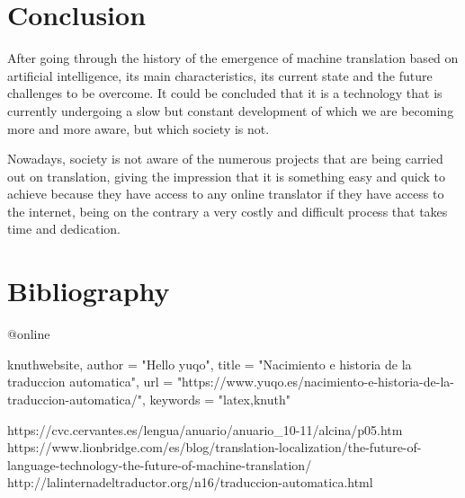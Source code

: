\documentclass[a4paper]{article}
\theoremstyle{plain}
\theoremstyle{definition}
\begin{document}
	
	\section{Conclusion}
	\label{sec:examples}	

	After going through the history of the emergence of machine translation based on artificial intelligence, its main characteristics, its current state and the future challenges to be overcome. It could be concluded that it is a technology that is currently undergoing a slow but constant development of which we are becoming more and more aware, but which society is not.\par 
    Nowadays, society is not aware of the numerous projects that are being carried out on translation, giving the impression that it is something easy and quick to achieve because they have access to any online translator if they have access to the internet, being on the contrary a very costly and difficult process that takes time and dedication.

	
	
	
	\newpage
    \usepackage{biblatex}
    \section{Bibliography}
    @online{knuthwebsite,
    author    = "Hello yuqo",
    title     = "Nacimiento e historia de la traduccion automatica",
    url       = "https://www.yuqo.es/nacimiento-e-historia-de-la-traduccion-automatica/",
    keywords  = "latex,knuth"
    
    https://cvc.cervantes.es/lengua/anuario/anuario_10-11/alcina/p05.htm
    https://www.lionbridge.com/es/blog/translation-localization/the-future-of-language-technology-the-future-of-machine-translation/
    http://lalinternadeltraductor.org/n16/traduccion-automatica.html
}
	
\end{document}
